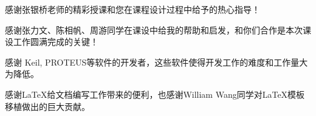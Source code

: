 
\begin{thanks}
  感谢张银桥老师的精彩授课和您在课程设计过程中给予的热心指导！
  
  感谢张力文、陈相帆、周游同学在课设中给我的帮助和启发，和你们合作是本次课设工作圆满完成的关键！
  
  感谢 Keil, PROTEUS等软件的开发者，这些软件使得开发工作的难度和工作量大为降低。

  感谢\LaTeX 给文档编写工作带来的便利，也感谢William Wang同学对\LaTeX 模板移植做出的巨大贡献。

\end{thanks}
\label{chap:thanks}